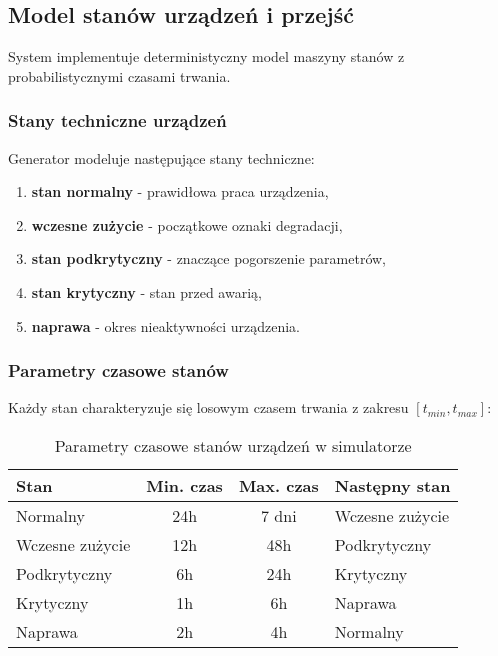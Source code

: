 \subsection{Model stanów urządzeń i przejść}
\label{subsec:model_stanow}

System implementuje deterministyczny model maszyny stanów z probabilistycznymi czasami trwania.

\subsubsection{Stany techniczne urządzeń}

Generator modeluje następujące stany techniczne:

\begin{enumerate}
    \item \textbf{stan normalny} - prawidłowa praca urządzenia,
    \item \textbf{wczesne zużycie} - początkowe oznaki degradacji,
    \item \textbf{stan podkrytyczny} - znaczące pogorszenie parametrów,
    \item \textbf{stan krytyczny} - stan przed awarią,
    \item \textbf{naprawa} - okres nieaktywności urządzenia.
\end{enumerate}

\subsubsection{Parametry czasowe stanów}

Każdy stan charakteryzuje się losowym czasem trwania z zakresu $[t_{min}, t_{max}]$:

\begin{table}[h]
\centering
\begin{tabular}{|l|c|c|l|}
\hline
\textbf{Stan} & \textbf{Min. czas} & \textbf{Max. czas} & \textbf{Następny stan} \\
\hline
Normalny & 24h & 7 dni & Wczesne zużycie \\
Wczesne zużycie & 12h & 48h & Podkrytyczny \\
Podkrytyczny & 6h & 24h & Krytyczny \\
Krytyczny & 1h & 6h & Naprawa \\
Naprawa & 2h & 4h & Normalny \\
\hline
\end{tabular}
\caption{Parametry czasowe stanów urządzeń w simulatorze}
\label{tab:parametry_stanow_sim}
\end{table}

